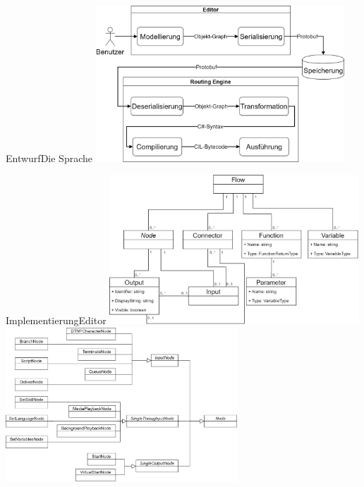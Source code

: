 \documentclass[t,aspectratio=169,divpsnames]{beamer}
\begin{document}
\begin{frame}{Entwurf}{Die Sprache}
{	}
	\only<4>
	{
		\center
		\includegraphics[width=0.7\textwidth]{img/Verarbeitungsschritte.png}
	}
\end{frame}

\begin{frame}{Implementierung}{Editor}
	\only<1>
	{	
		\center
		\includegraphics[width=0.7\textwidth]{img/FlowClassStructure.png}
	}
	\only<2>
	{
		\center
		\includegraphics[width=0.65\textwidth]{img/NodeHierarchy.png}
	}
\end{frame}
\end{document}

